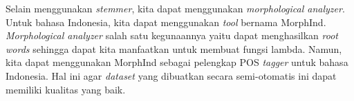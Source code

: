 Selain menggunakan \textit{stemmer}, kita dapat menggunakan \textit{morphological analyzer}.
Untuk bahasa Indonesia, kita dapat menggunakan \textit{tool} bernama MorphInd\footnotemark[3].
\textit{Morphological analyzer} salah satu kegunaannya yaitu dapat menghasilkan \textit{root words}
sehingga dapat kita manfaatkan untuk membuat fungsi lambda.
Namun, kita dapat menggunakan MorphInd sebagai pelengkap POS \textit{tagger} untuk bahasa Indonesia.
Hal ini agar \textit{dataset} yang dibuatkan secara semi-otomatis ini dapat memiliki kualitas yang
baik.

